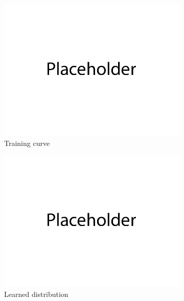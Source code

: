 \documentclass{article}
\begin{document}
\begin{figure}[H]
    \centering
    \begin{subfigure}{0.32\textwidth}
        \centering
        \includegraphics[width=\textwidth]{figures/q1_dset2_train_plot.png}
        \caption{Training curve}
    \end{subfigure}
    \begin{subfigure}{0.32\textwidth}
        \centering
        \includegraphics[width=\textwidth]{figures/q1_dset2_densities.png}
        \caption{Learned distribution}
    \end{subfigure}
    \begin{subfigure}{0.32\textwidth}
        \centering

\end{subfigure}
\end{figure}
\end{document}
